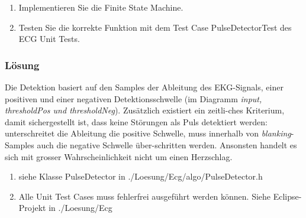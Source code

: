 \begin{enumerate}
  \item Implementieren Sie die Finite State Machine.
\item  Testen Sie die korrekte Funktion mit dem Test Case PulseDetectorTest des ECG Unit Tests.
\end{enumerate}

\subsubsection{Lösung}

Die Detektion basiert auf den Samples der Ableitung des EKG-Signals, einer positiven und einer negativen Detektionsschwelle (im Diagramm \textit{input, thresholdPos und thresholdNeg}). Zusätzlich existiert ein zeitli-ches Kriterium, damit sichergestellt ist, dass keine Störungen als Puls detektiert werden: unterschreitet die Ableitung die positive Schwelle, muss innerhalb von \textit{blanking}-Samples auch die negative Schwelle über-schritten werden. Ansonsten handelt es sich mit grosser Wahrscheinlichkeit nicht um einen Herzschlag.

\begin{enumerate}
  \item siehe Klasse PulseDetector in ./Loesung/Ecg/algo/PulseDetector.h
\item  Alle Unit Test Cases muss fehlerfrei ausgeführt werden können. Siehe Eclipse-Projekt in ./Loesung/Ecg
\end{enumerate}


